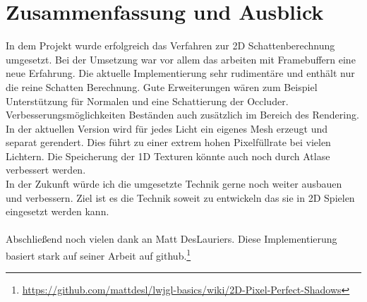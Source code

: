 \chapter{Zusammenfassung und Ausblick}
In dem Projekt wurde erfolgreich das Verfahren zur 2D Schattenberechnung umgesetzt.
Bei der Umsetzung war vor allem das arbeiten mit Framebuffern eine neue Erfahrung.
Die aktuelle Implementierung sehr rudimentäre und enthält nur die reine Schatten Berechnung.
Gute Erweiterungen wären zum Beispiel Unterstützung für Normalen und eine Schattierung der Occluder.
Verbesserungsmöglichkeiten Beständen auch zusätzlich im Bereich des Rendering. In der aktuellen Version wird für jedes Licht ein eigenes Mesh erzeugt und separat gerendert. Dies führt zu einer extrem hohen Pixelfüllrate bei vielen Lichtern.
Die Speicherung der 1D Texturen könnte auch noch durch Atlase verbessert werden.\\
In der Zukunft würde ich die umgesetzte Technik gerne noch weiter ausbauen und verbessern.
Ziel ist es die Technik soweit zu entwickeln das sie in 2D Spielen eingesetzt werden kann.
\\
\\
Abschließend noch vielen dank an Matt DesLauriers. Diese Implementierung basiert stark auf seiner Arbeit auf github.\footnote{\url{https://github.com/mattdesl/lwjgl-basics/wiki/2D-Pixel-Perfect-Shadows}} \nocite{mattdesl:13} 